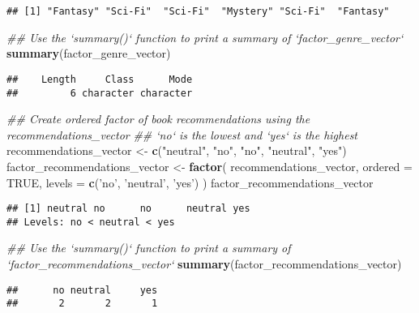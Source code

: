 \documentclass[
]{article}
\newenvironment{Shaded}{\begin{snugshade}}{\end{snugshade}}
\newcommand{\CommentTok}[1]{\textcolor[rgb]{0.56,0.35,0.01}{\textit{#1}}}
\newcommand{\DataTypeTok}[1]{\textcolor[rgb]{0.13,0.29,0.53}{#1}}
\newcommand{\KeywordTok}[1]{\textcolor[rgb]{0.13,0.29,0.53}{\textbf{#1}}}
\newcommand{\NormalTok}[1]{#1}
\newcommand{\OtherTok}[1]{\textcolor[rgb]{0.56,0.35,0.01}{#1}}
\newcommand{\StringTok}[1]{\textcolor[rgb]{0.31,0.60,0.02}{#1}}
\begin{document}
\begin{verbatim}
## [1] "Fantasy" "Sci-Fi"  "Sci-Fi"  "Mystery" "Sci-Fi"  "Fantasy"
\end{verbatim}

\begin{Shaded}
\begin{Highlighting}[]
\CommentTok{## Use the `summary()` function to print a summary of `factor_genre_vector`}
\KeywordTok{summary}\NormalTok{(factor_genre_vector)}
\end{Highlighting}
\end{Shaded}

\begin{verbatim}
##    Length     Class      Mode 
##         6 character character
\end{verbatim}

\begin{Shaded}
\begin{Highlighting}[]
\CommentTok{## Create ordered factor of book recommendations using the recommendations_vector}
\CommentTok{## `no` is the lowest and `yes` is the highest}
\NormalTok{recommendations_vector <-}\StringTok{ }\KeywordTok{c}\NormalTok{(}\StringTok{"neutral"}\NormalTok{, }\StringTok{"no"}\NormalTok{, }\StringTok{"no"}\NormalTok{, }\StringTok{"neutral"}\NormalTok{, }\StringTok{"yes"}\NormalTok{)}
\NormalTok{factor_recommendations_vector <-}\StringTok{ }\KeywordTok{factor}\NormalTok{(}
\NormalTok{  recommendations_vector,}
  \DataTypeTok{ordered =} \OtherTok{TRUE}\NormalTok{,}
  \DataTypeTok{levels =} \KeywordTok{c}\NormalTok{(}\StringTok{'no'}\NormalTok{, }\StringTok{'neutral'}\NormalTok{, }\StringTok{'yes'}\NormalTok{)}
\NormalTok{)}
\NormalTok{factor_recommendations_vector}
\end{Highlighting}
\end{Shaded}

\begin{verbatim}
## [1] neutral no      no      neutral yes    
## Levels: no < neutral < yes
\end{verbatim}

\begin{Shaded}
\begin{Highlighting}[]
\CommentTok{## Use the `summary()` function to print a summary of `factor_recommendations_vector`}
\KeywordTok{summary}\NormalTok{(factor_recommendations_vector)}
\end{Highlighting}
\end{Shaded}

\begin{verbatim}
##      no neutral     yes 
##       2       2       1
\end{verbatim}
\end{document}
